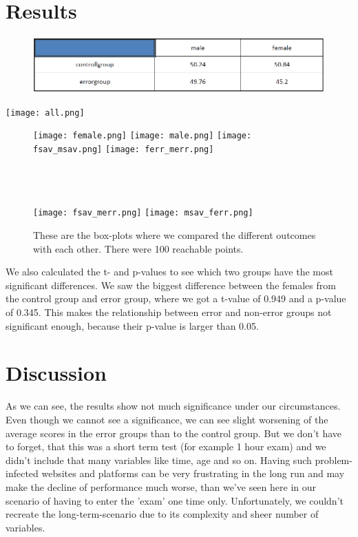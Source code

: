 \documentclass[12pt, a4paper]{article}
\begin{document}
\section{Results}
\begin{figure}[h]
    \includegraphics[width=\textwidth]{results.PNG}
\end{figure}
\begin{center}
    \texttt{[image: all.png]}
\end{center}
\begin{figure}[h]
    \texttt{[image: female.png]}
    \texttt{[image: male.png]}
    \texttt{[image: fsav\_msav.png]}
    \texttt{[image: ferr\_merr.png]}\\\\\\\\
\end{figure}
\begin{figure}[h]
    \texttt{[image: fsav\_merr.png]}
    \texttt{[image: msav\_ferr.png]}
    \caption{These are the box-plots where we compared the different outcomes with each other. There were 100 reachable points.}
\end{figure}
We also calculated the t- and p-values to see which two groups have the most significant differences. 
We saw the biggest difference between the females from the control group and error group, where we 
got a t-value of 0.949 and a p-value of 0.345. This makes the relationship between error and 
non-error groups not significant enough, because their p-value is larger than 0.05.   

\section{Discussion}
As we can see, the results show not much significance under our circumstances. Even though we cannot see a significance, we can see slight worsening of the average scores in the error groups than to the control group. But we don't have to forget, that this was a short term test (for example 1 hour exam) and we didn't include that many variables like time, age and so on. Having such problem-infected websites and platforms can be very frustrating in the long run and may make the decline of performance much worse, than we've seen here in our scenario of having to enter the 'exam' one time only.  Unfortunately, we couldn't recreate the long-term-scenario due to its complexity and sheer number of variables.          
\end{document}
